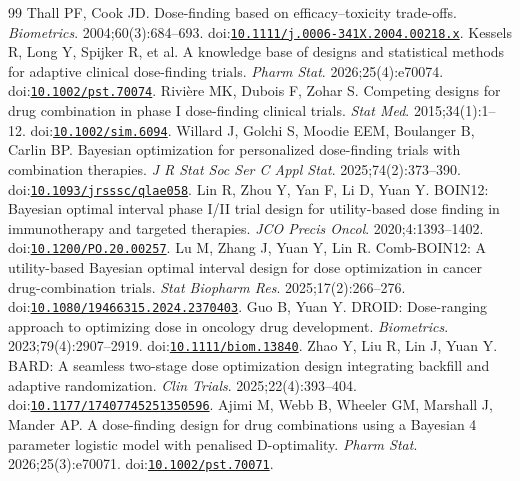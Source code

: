 \documentclass[11pt]{article}
\newcommand{\revisioncolor}{}
\begin{document}
\begingroup
\small
\setlength{\bibsep}{2pt}
\revisioncolor
\renewcommand{\bibnumfmt}[1]{#1.}
\begin{thebibliography}{99}
\small
\setlength{\bibsep}{2.5pt}
 Thall PF, Cook JD. Dose-finding based on efficacy--toxicity trade-offs. \textit{Biometrics}. 2004;60(3):684--693. doi:\href{https://doi.org/10.1111/j.0006-341X.2004.00218.x}{\nolinkurl{10.1111/j.0006-341X.2004.00218.x}}.
 Kessels R, Long Y, Spijker R, et al. A knowledge base of designs and statistical methods for adaptive clinical dose-finding trials. \textit{Pharm Stat}. 2026;25(4):e70074. doi:\href{https://doi.org/10.1002/pst.70074}{\nolinkurl{10.1002/pst.70074}}.
 Rivi\`ere MK, Dubois F, Zohar S. Competing designs for drug combination in phase I dose-finding clinical trials. \textit{Stat Med}. 2015;34(1):1--12. doi:\href{https://doi.org/10.1002/sim.6094}{\nolinkurl{10.1002/sim.6094}}.
 Willard J, Golchi S, Moodie EEM, Boulanger B, Carlin BP. Bayesian optimization for personalized dose-finding trials with combination therapies. \textit{J R Stat Soc Ser C Appl Stat}. 2025;74(2):373--390. doi:\href{https://doi.org/10.1093/jrsssc/qlae058}{\nolinkurl{10.1093/jrsssc/qlae058}}.
 Lin R, Zhou Y, Yan F, Li D, Yuan Y. BOIN12: Bayesian optimal interval phase I/II trial design for utility-based dose finding in immunotherapy and targeted therapies. \textit{JCO Precis Oncol}. 2020;4:1393--1402. doi:\href{https://doi.org/10.1200/PO.20.00257}{\nolinkurl{10.1200/PO.20.00257}}.
 Lu M, Zhang J, Yuan Y, Lin R. Comb-BOIN12: A utility-based Bayesian optimal interval design for dose optimization in cancer drug-combination trials. \textit{Stat Biopharm Res}. 2025;17(2):266--276. doi:\href{https://doi.org/10.1080/19466315.2024.2370403}{\nolinkurl{10.1080/19466315.2024.2370403}}.
 Guo B, Yuan Y. DROID: Dose-ranging approach to optimizing dose in oncology drug development. \textit{Biometrics}. 2023;79(4):2907--2919. doi:\href{https://doi.org/10.1111/biom.13840}{\nolinkurl{10.1111/biom.13840}}.
 Zhao Y, Liu R, Lin J, Yuan Y. BARD: A seamless two-stage dose optimization design integrating backfill and adaptive randomization. \textit{Clin Trials}. 2025;22(4):393--404. doi:\href{https://doi.org/10.1177/17407745251350596}{\nolinkurl{10.1177/17407745251350596}}.
 Ajimi M, Webb B, Wheeler GM, Marshall J, Mander AP. A dose-finding design for drug combinations using a Bayesian 4 parameter logistic model with penalised D-optimality. \textit{Pharm Stat}. 2026;25(3):e70071. doi:\href{https://doi.org/10.1002/pst.70071}{\nolinkurl{10.1002/pst.70071}}.

\end{thebibliography}
\end{document}
